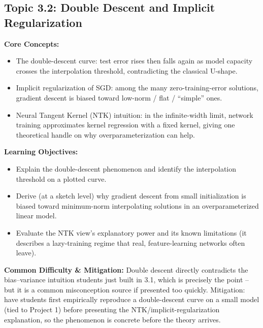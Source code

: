 \documentclass[11pt]{article}
\begin{document}
\subsection{Topic 3.2: Double Descent and Implicit Regularization}

\textbf{Core Concepts:}
\begin{itemize}
  \item The double-descent curve: test error rises then falls again as model capacity crosses the interpolation threshold, contradicting the classical U-shape.
  \item Implicit regularization of SGD: among the many zero-training-error solutions, gradient descent is biased toward low-norm / flat / ``simple'' ones.
  \item Neural Tangent Kernel (NTK) intuition: in the infinite-width limit, network training approximates kernel regression with a fixed kernel, giving one theoretical handle on why overparameterization can help.
\end{itemize}

\textbf{Learning Objectives:}
\begin{itemize}
  \item Explain the double-descent phenomenon and identify the interpolation threshold on a plotted curve.
  \item Derive (at a sketch level) why gradient descent from small initialization is biased toward minimum-norm interpolating solutions in an overparameterized linear model.
  \item Evaluate the NTK view's explanatory power and its known limitations (it describes a lazy-training regime that real, feature-learning networks often leave).
\end{itemize}

\textbf{Common Difficulty \& Mitigation:} Double descent directly contradicts the bias--variance intuition students just built in 3.1, which is precisely the point -- but it is a common misconception source if presented too quickly. Mitigation: have students first empirically reproduce a double-descent curve on a small model (tied to Project 1) before presenting the NTK/implicit-regularization explanation, so the phenomenon is concrete before the theory arrives.
\end{document}
